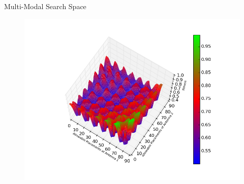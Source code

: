 \documentclass{beamer}
\begin{document}
\begin{frame}[t]{Multi-Modal Search Space}
    \begin{figure}
        \vspace*{-0.35cm}
        \centering
        \includegraphics[scale=0.48]{../paper/FIG/tc1_ss}
    \end{figure}
\end{frame}
\end{document}
